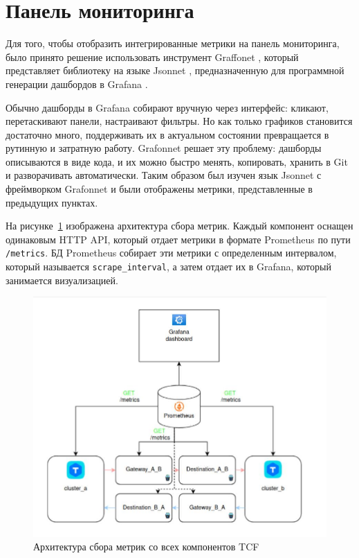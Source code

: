 \section{Панель мониторинга}

Для того, чтобы отобразить интегрированные метрики на панель мониторинга, было принято решение использовать
инструмент Graffonet \cite{grafonnet}, который представляет библиотеку на языке Jsonnet \cite{jsonnet}, предназначенную для программной
генерации дашбордов в Grafana \cite{grafana}.

Обычно дашборды в Grafana собирают вручную через интерфейс: кликают, перетаскивают панели, настраивают
фильтры. Но как только графиков становится достаточно много, поддерживать их в актуальном состоянии
превращается в рутинную и затратную работу. Grafonnet решает эту проблему: дашборды
описываются в виде кода, и их можно быстро менять, копировать, хранить в Git и разворачивать
автоматически. Таким образом был изучен язык Jsonnet с фреймворком Grafonnet и были отображены метрики,
представленные в предыдущих пунктах.

На рисунке~\ref{fig:architecture} изображена архитектура сбора метрик. Каждый компонент оснащен одинаковым
HTTP API, который отдает метрики в формате Prometheus по пути \texttt{/metrics}. БД Prometheus собирает
эти метрики с определенным интервалом, который называется \texttt{scrape\_interval}, а затем отдает их в
Grafana, который занимается визуализацией.

\begin{figure}
  \centering
  \includegraphics[scale=0.4]{assets/monitoring_architecture.jpg}
  \caption{Архитектура сбора метрик со всех компонентов TCF}
  \label{fig:architecture}
\end{figure}

